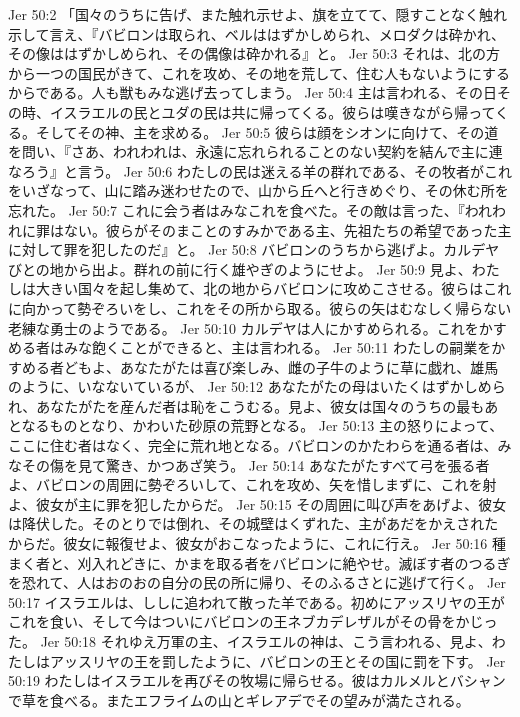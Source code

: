 Jer 50:2  「国々のうちに告げ、また触れ示せよ、旗を立てて、隠すことなく触れ示して言え、『バビロンは取られ、ベルははずかしめられ、メロダクは砕かれ、その像ははずかしめられ、その偶像は砕かれる』と。
Jer 50:3  それは、北の方から一つの国民がきて、これを攻め、その地を荒して、住む人もないようにするからである。人も獣もみな逃げ去ってしまう。
Jer 50:4  主は言われる、その日その時、イスラエルの民とユダの民は共に帰ってくる。彼らは嘆きながら帰ってくる。そしてその神、主を求める。
Jer 50:5  彼らは顔をシオンに向けて、その道を問い、『さあ、われわれは、永遠に忘れられることのない契約を結んで主に連なろう』と言う。
Jer 50:6  わたしの民は迷える羊の群れである、その牧者がこれをいざなって、山に踏み迷わせたので、山から丘へと行きめぐり、その休む所を忘れた。
Jer 50:7  これに会う者はみなこれを食べた。その敵は言った、『われわれに罪はない。彼らがそのまことのすみかである主、先祖たちの希望であった主に対して罪を犯したのだ』と。
Jer 50:8  バビロンのうちから逃げよ。カルデヤびとの地から出よ。群れの前に行く雄やぎのようにせよ。
Jer 50:9  見よ、わたしは大きい国々を起し集めて、北の地からバビロンに攻めこさせる。彼らはこれに向かって勢ぞろいをし、これをその所から取る。彼らの矢はむなしく帰らない老練な勇士のようである。
Jer 50:10  カルデヤは人にかすめられる。これをかすめる者はみな飽くことができると、主は言われる。
Jer 50:11  わたしの嗣業をかすめる者どもよ、あなたがたは喜び楽しみ、雌の子牛のように草に戯れ、雄馬のように、いなないているが、
Jer 50:12  あなたがたの母はいたくはずかしめられ、あなたがたを産んだ者は恥をこうむる。見よ、彼女は国々のうちの最もあとなるものとなり、かわいた砂原の荒野となる。
Jer 50:13  主の怒りによって、ここに住む者はなく、完全に荒れ地となる。バビロンのかたわらを通る者は、みなその傷を見て驚き、かつあざ笑う。
Jer 50:14  あなたがたすべて弓を張る者よ、バビロンの周囲に勢ぞろいして、これを攻め、矢を惜しまずに、これを射よ、彼女が主に罪を犯したからだ。
Jer 50:15  その周囲に叫び声をあげよ、彼女は降伏した。そのとりでは倒れ、その城壁はくずれた、主があだをかえされたからだ。彼女に報復せよ、彼女がおこなったように、これに行え。
Jer 50:16  種まく者と、刈入れどきに、かまを取る者をバビロンに絶やせ。滅ぼす者のつるぎを恐れて、人はおのおの自分の民の所に帰り、そのふるさとに逃げて行く。
Jer 50:17  イスラエルは、ししに追われて散った羊である。初めにアッスリヤの王がこれを食い、そして今はついにバビロンの王ネブカデレザルがその骨をかじった。
Jer 50:18  それゆえ万軍の主、イスラエルの神は、こう言われる、見よ、わたしはアッスリヤの王を罰したように、バビロンの王とその国に罰を下す。
Jer 50:19  わたしはイスラエルを再びその牧場に帰らせる。彼はカルメルとバシャンで草を食べる。またエフライムの山とギレアデでその望みが満たされる。
